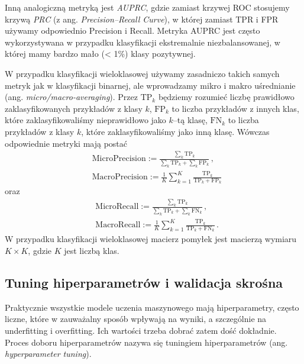 \documentclass{myclass}
\begin{document}
Inną analogiczną metryką jest \emph{AUPRC}, gdzie zamiast krzywej ROC stosujemy krzywą \emph{PRC} (z
ang. \emph{Precision--Recall Curve}), w której zamiast TPR i FPR używamy odpowiednio Precision i
Recall. Metryka AUPRC jest często wykorzystywana w przypadku klasyfikacji ekstremalnie
niezbalansowanej, w której mamy bardzo mało (< 1\%) klasy pozytywnej.

W przypadku klasyfikacji wieloklasowej używamy zasadniczo takich samych metryk jak w klasyfikacji
binarnej, ale wprowadzamy mikro i makro uśrednianie (ang. \emph{micro/macro-averaging}). Przez
\(\mathrm{TP}_k\) będziemy rozumieć liczbę prawidłowo zaklasyfikowanych przykładów z klasy \(k\),
\(\mathrm{FP}_k\) to liczba przykładów z innych klas, które zaklasyfikowaliśmy nieprawidłowo jako
\(k\)--tą klasę, \(\mathrm{FN}_k\) to liczba przykładów z klasy \(k\), które zaklasyfikowaliśmy jako
inną klasę. Wówczas odpowiednie metryki mają postać
\[
\begin{split}
&\mathrm{MicroPrecision} := \frac{\sum_{k} \mathrm{TP}_k}{\sum_{k} \mathrm{TP}_k + \sum_{k} \mathrm{FP}_k}\,,\\
&\mathrm{MacroPrecision} := \frac{1}{K} \sum_{k=1}^K \frac{\mathrm{TP}_k}{\mathrm{TP}_k + \mathrm{FP}_k}
\end{split}
\]
oraz
\[
\begin{split}
&\mathrm{MicroRecall} := \frac{\sum_{k} \mathrm{TP}_k}{\sum_{k} \mathrm{TP}_k + \sum_{k} \mathrm{FN}_k}\,,\\
&\mathrm{MacroRecall} := \frac{1}{K} \sum_{k=1}^K \frac{\mathrm{TP}_k}{\mathrm{TP}_k + \mathrm{FN}_k}\,.
\end{split}
\]
W przypadku klasyfikacji wieloklasowej macierz pomyłek jest macierzą wymiaru \(K \times K\), gdzie
\(K\) jest liczbą klas.

\subsection{Tuning hiperparametrów i walidacja skrośna}

Praktycznie wszystkie modele uczenia maszynowego mają hiperparametry, często liczne, które w
zauważalny sposób wpływają na wyniki, a szczególnie na underfitting i overfitting. Ich wartości
trzeba dobrać zatem dość dokładnie. Proces doboru hiperparametrów nazywa się tuningiem
hiperparametrów (ang. \emph{hyperparameter tuning}).
\end{document}
